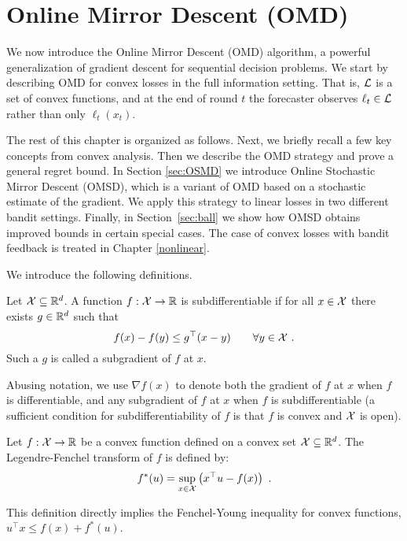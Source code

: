 \section{Online Mirror Descent (OMD)} \label{sec:OMD}
We now introduce the Online Mirror Descent (OMD) algorithm, a powerful generalization of gradient descent for sequential decision problems. We start by describing OMD for convex losses in the full information setting. That is, $\mathcal{L}$ is a set of convex functions, and at the end of round $t$ the forecaster observes $\ell_t\in\mathcal{L}$ rather than only $\ell_t(x_t)$. 

The rest of this chapter is organized as follows. Next, we briefly recall a few key concepts from convex analysis. Then we describe the OMD strategy and prove a general regret bound. In Section \ref{sec:OSMD} we introduce Online Stochastic Mirror Descent (OMSD), which is a variant of OMD based on a stochastic estimate of the gradient. We apply this strategy to linear losses in two different bandit settings. Finally, in Section~\ref{sec:ball} we show how OMSD obtains improved bounds in certain special cases. The case of convex losses with bandit feedback is treated in Chapter \ref{nonlinear}.

We introduce the following definitions.
%
\begin{definition}
Let $\mathcal{X}\subseteq\mathbb{R}^d$.
A function $f : \mathcal{X} \to \mathbb{R}$ is subdifferentiable if for all $x \in \mathcal{X}$ there exists $g \in \mathbb{R}^d$ such that
$$f(x) - f(y) \leq g^{\top} (x-y) \qquad\forall y \in \mathcal{X}~.$$
Such a $g$ is called a subgradient of $f$ at $x$.
\end{definition}
Abusing notation, we use $\nabla f(x)$ to denote both the gradient of $f$ at $x$ when $f$ is differentiable, and any subgradient of $f$ at $x$ when $f$ is subdifferentiable (a sufficient condition for subdifferentiability of $f$ is that $f$ is convex and $\mathcal{X}$ is open).
%
\begin{definition}
Let $f : \mathcal{X} \rightarrow \mathbb{R}$ be a convex function defined on a convex set $\mathcal{X}\subseteq\mathbb{R}^d$. The Legendre-Fenchel transform of $f$ is defined by:
$$f^*(u) = \sup_{x \in \mathcal{X}} \left(x^{\top} u - f(x)\right)~.$$
\end{definition}
This definition directly implies the Fenchel-Young inequality for convex functions,
$u^{\top} x \leq f(x) + f^*(u)$.
%

